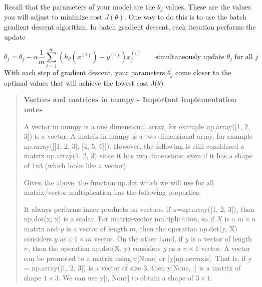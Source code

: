 \documentclass[11pt]{article}
\begin{document}
Recall that the parameters of your model are the \(\theta_j\) values. These are the values you will adjust to minimize cost \(J(\theta)\). One way to do this is to use the batch gradient descent algorithm. In batch gradient descent, each iteration performs the update

$$ \theta_j = \theta_j - \alpha \frac{1}{m} \sum_{i=1}^m \left( h_\theta(x^{(i)}) - y^{(i)}\right)x_j^{(i)} \qquad \text{simultaneously update } \theta_j \text{ for all } j$$
With each step of gradient descent, your parameters \(\theta_j\) come closer to the optimal values that will achieve the lowest cost J(\(\theta\)).

\begin{quote}
\textbf{Vectors and matrices in numpy - Important implementation notes}

A vector in numpy is a one dimensional array, for example np.array([1, 2, 3]) is a vector. A matrix in numpy is a two dimensional array, for example np.array([[1, 2, 3], [4, 5, 6]]). However, the following is still considered a matrix np.array(1, 2, 3) since it has two dimensions, even if it has a shape of 1x3 (which looks like a vector).

Given the above, the function np.dot which we will use for all matrix/vector multiplication has the following properties:

It always performs inner products on vectors. If x=np.array([1, 2, 3]), then np.dot(x, x) is a scalar.
For matrix-vector multiplication, so if \(X\) is a \(m\times n\) matrix and \(y\) is a vector of length \(m\), then the operation np.dot(y, X) considers \(y\) as a \(1 \times m\) vector. On the other hand, if \(y\) is a vector of length \(n\), then the operation np.dot(X, y) considers \(y\) as a \(n \times 1\) vector.
A vector can be promoted to a matrix using y[None] or [y[np.newaxis]. That is, if y = np.array([1, 2, 3]) is a vector of size 3, then y[None, :] is a matrix of shape \(1 \times 3\). We can use y[:, None] to obtain a shape of \(3 \times 1\).
\end{quote}
\end{document}
